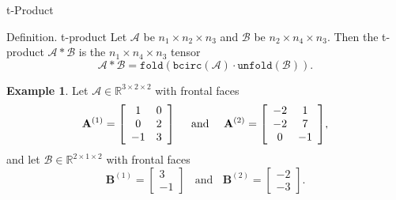 \documentclass{beamer}
\begin{document}

\begin{frame}{t-Product}
\begin{block}{Definition. t-product}
Let $\mathcal{A}$ be $n_1 \times n_2 \times n_3$ and $\mathcal{B}$ be $n_2 \times n_4 \times n_3$. Then the t-product $\mathcal{A} * \mathcal{B}$ is the $n_1 \times n_4 \times n_3$ tensor 
$$\mathcal{A}*\mathcal{B}=\texttt{fold}(\texttt{bcirc}(\mathcal{A})\cdot\texttt{unfold}(\mathcal{B})).$$
\end{block}
\textbf{Example 1}. Let $\mathcal{A}\in\mathbb{R}^{3\times 2 \times 2}$ with frontal faces
$$
\mathbf{A}^{(1)}=\left[
\begin{array}{c c}
  1 & 0 \\
  0 & 2 \\
  -1 & 3
\end{array}
\right]~~~~
\text{and}~~~~\mathbf{A}^{(2)}=\mleft[
\begin{array}{c c}
  -2 & 1 \\
  -2 & 7 \\
  0 & -1
\end{array}
\mright],
$$
and let $\mathcal{B}\in\mathbb{R}^{2\times 1 \times 2}$ with frontal faces
$$
\mathbf{B}^{(1)}=
\left[\begin{matrix}
3\\
-1
\end{matrix}\right]
~~~~\text{and}~~~~
\mathbf{B}^{(2)}=
\left[\begin{matrix}
-2\\
-3
\end{matrix}\right].
$$
\end{frame}

\end{document}

